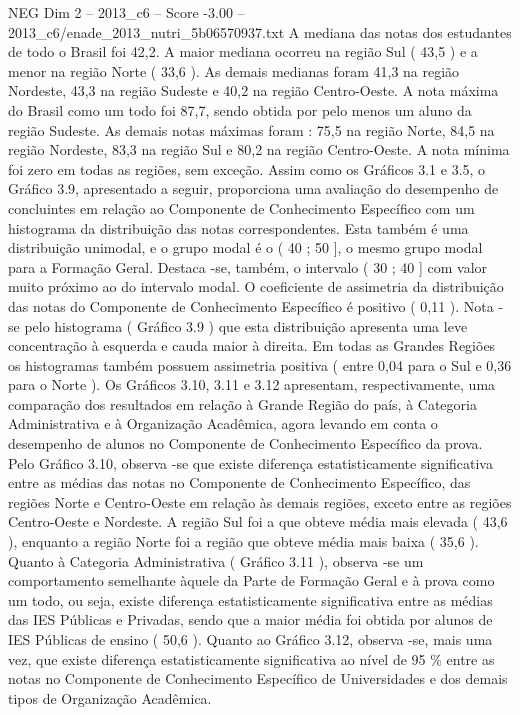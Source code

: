 \begin{textsample}{NEG Dim 2 – 2013\_c6 – Score -3.00 – 2013\_c6/enade\_2013\_nutri\_5b06570937.txt}
A mediana das notas dos estudantes de todo o Brasil foi 42,2.
A maior mediana ocorreu na região Sul ( 43,5 ) e a menor na região Norte ( 33,6 ).
As demais medianas foram 41,3 na região Nordeste, 43,3 na região Sudeste e 40,2 na região Centro-Oeste.
A nota máxima do Brasil como um todo foi 87,7, sendo obtida por pelo menos um aluno da região Sudeste.
As demais notas máximas foram : 75,5 na região Norte, 84,5 na região Nordeste, 83,3 na região Sul e 80,2 na região Centro-Oeste.
A nota mínima foi zero em todas as regiões, sem exceção.
Assim como os Gráficos 3.1 e 3.5, o Gráfico 3.9, apresentado a seguir, proporciona uma avaliação do desempenho de concluintes em relação ao Componente de Conhecimento Específico com um histograma da distribuição das notas correspondentes.
Esta também é uma distribuição unimodal, e o grupo modal é o ( 40 ; 50 ], o mesmo grupo modal para a Formação Geral.
Destaca -se, também, o intervalo ( 30 ; 40 ] com valor muito próximo ao do intervalo modal.
O coeficiente de assimetria da distribuição das notas do Componente de Conhecimento Específico é positivo ( 0,11 ).
Nota -se pelo histograma ( Gráfico 3.9 ) que esta distribuição apresenta uma leve concentração à esquerda e cauda maior à direita.
Em todas as Grandes Regiões os histogramas também possuem assimetria positiva ( entre 0,04 para o Sul e 0,36 para o Norte ).
Os Gráficos 3.10, 3.11 e 3.12 apresentam, respectivamente, uma comparação dos resultados em relação à Grande Região do país, à Categoria Administrativa e à Organização Acadêmica, agora levando em conta o desempenho de alunos no Componente de Conhecimento Específico da prova.
Pelo Gráfico 3.10, observa -se que existe diferença estatisticamente significativa entre as médias das notas no Componente de Conhecimento Específico, das regiões Norte e Centro-Oeste em relação às demais regiões, exceto entre as regiões Centro-Oeste e Nordeste.
A região Sul foi a que obteve média mais elevada ( 43,6 ), enquanto a região Norte foi a região que obteve média mais baixa ( 35,6 ).
Quanto à Categoria Administrativa ( Gráfico 3.11 ), observa -se um comportamento semelhante àquele da Parte de Formação Geral e à prova como um todo, ou seja, existe diferença estatisticamente significativa entre as médias das IES Públicas e Privadas, sendo que a maior média foi obtida por alunos de IES Públicas de ensino ( 50,6 ).
Quanto ao Gráfico 3.12, observa -se, mais uma vez, que existe diferença estatisticamente significativa ao nível de 95 \% entre as notas no Componente de Conhecimento Específico de Universidades e dos demais tipos de Organização Acadêmica.

\end{textsample}
